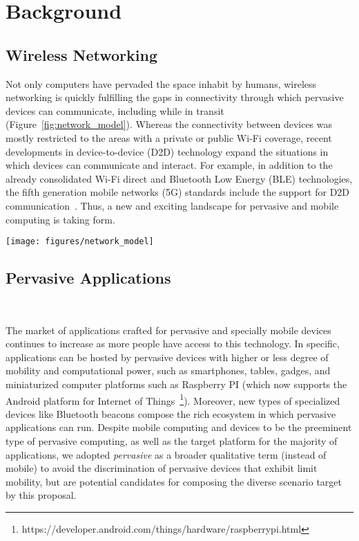 \section{Background}\label{sec:background}


\subsection{Wireless Networking}

Not only computers have pervaded the space inhabit by humans, wireless networking is quickly fulfilling the gaps in connectivity through which pervasive devices can communicate, including while in transit (Figure~\ref{fig:network_model}). Whereas the connectivity between devices was mostly restricted to the areas with a private or public Wi-Fi coverage, recent developments in device-to-device (D2D) technology expand the situations in which devices can communicate and interact. For example, in addition to the already consolidated Wi-Fi direct and Bluetooth Low Energy (BLE) technologies, the fifth generation mobile networks (5G) standards include the support for D2D communication~\cite{Tehrani:2014}. Thus, a new and exciting landscape for pervasive and mobile computing is taking form.

\begin{figure*}[t!]
	\centering
	\texttt{[image: figures/network\_model]}
	\caption{Application nodes communicating through Wi-Fi or D2D technologies}
	\label{fig:network_model}
\end{figure*}


\subsection{Pervasive Applications}~\label{sec:characterization}

The market of applications crafted for pervasive and specially mobile devices continues to increase as more people have access to this technology. In specific, applications can be hosted by pervasive devices with higher or less degree of mobility and computational power, such as smartphones, tables, gadges, and miniaturized computer platforms such as Raspberry PI (which now supports the Android platform for Internet of Things~\footnote{https://developer.android.com/things/hardware/raspberrypi.html}). Moreover, new types of specialized devices like Bluetooth beacons compose the rich ecosystem in which pervasive applications can run. Despite mobile computing and devices to be the preeminent type of pervasive computing, as well as the target platform for the majority of applications, we adopted \textit{pervasive} as a broader qualitative term (instead of mobile) to avoid the discrimination of pervasive devices that exhibit limit mobility, but are potential candidates for composing the diverse scenario target by this proposal. 

